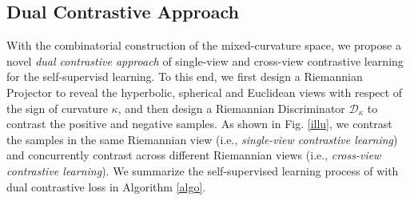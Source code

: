 \subsection{Dual Contrastive Approach}
With the combinatorial construction of the mixed-curvature space, we propose a novel \emph{dual contrastive approach} of single-view and cross-view contrastive learning for the self-supervisd learning.
To this end, we first design a Riemannian Projector to reveal the hyperbolic, spherical and Euclidean views with respect of the sign of curvature $\kappa$, and then design a Riemannian Discriminator $\mathcal D_\kappa$ to contrast the positive and negative samples.
As shown in Fig. \ref{illu}, 
we contrast the samples in the same Riemannian view (i.e., \emph{single-view contrastive learning})
and concurrently contrast across different Riemannian views (i.e.,  \emph{cross-view contrastive learning}). 
We summarize the self-supervised learning process of  with dual contrastive loss in Algorithm \ref{algo}. 



